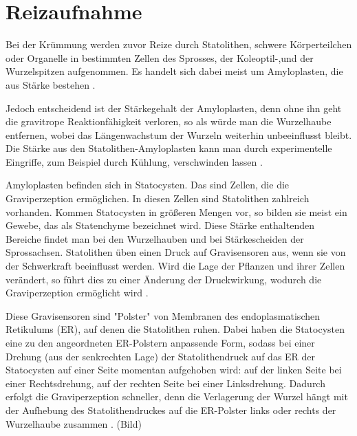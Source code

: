 \documentclass[
a4paper, 
11pt, 
ngerman,
listof=totoc,
bibliography=totocnumbered,
abstracton
]{scrreprt}
\begin{document}
\section{Reizaufnahme}

Bei der Krümmung werden zuvor Reize durch Statolithen, schwere Körperteilchen oder Organelle in bestimmten Zellen des Sprosses, der Koleoptil-,und der Wurzelspitzen aufgenommen. Es handelt sich dabei meist um Amyloplasten, die aus Stärke bestehen \parencite[530]{Luettge}.

Jedoch entscheidend ist der Stärkegehalt  der Amyloplasten, denn ohne ihn geht die gravitrope Reaktionfähigkeit verloren, so als würde man die Wurzelhaube entfernen, wobei das Längenwachstum der Wurzeln weiterhin unbeeinflusst bleibt.
Die Stärke aus den Statolithen-Amyloplasten kann man durch experimentelle Eingriffe, zum Beispiel durch Kühlung, verschwinden lassen \parencite[452]{Strasburger}.

Amyloplasten befinden sich in Statocysten. Das sind Zellen, die die Graviperzeption ermöglichen. In diesen Zellen sind Statolithen zahlreich vorhanden. Kommen Statocysten in größeren Mengen vor, so bilden sie meist ein Gewebe, das als Statenchyme bezeichnet wird.
Diese Stärke enthaltenden Bereiche findet man bei den Wurzelhauben und bei Stärkescheiden der Sprossachsen.  
Statolithen üben einen Druck auf Gravisensoren aus, wenn sie von der Schwerkraft beeinflusst werden. Wird die Lage der Pflanzen und ihrer Zellen verändert, so führt dies zu einer Änderung der Druckwirkung, wodurch die Graviperzeption ermöglicht wird \parencite[501f]{Nultsch}.


Diese Gravisensoren sind "Polster" von Membranen des endoplasmatischen Retikulums (ER), auf denen die Statolithen ruhen.
Dabei haben die Statocysten eine zu den angeordneten ER-Polstern anpassende Form, sodass bei einer Drehung (aus der senkrechten Lage) der Statolithendruck auf das ER der Statocysten auf einer Seite momentan aufgehoben wird: auf der linken Seite bei einer Rechtsdrehung, auf der rechten Seite bei einer Linksdrehung.
Dadurch erfolgt die Graviperzeption schneller, denn die Verlagerung der Wurzel hängt  mit der Aufhebung des Statolithendruckes auf die ER-Polster links oder rechts der Wurzelhaube zusammen \parencite[531f]{Luettge}. (Bild)
\end{document}
